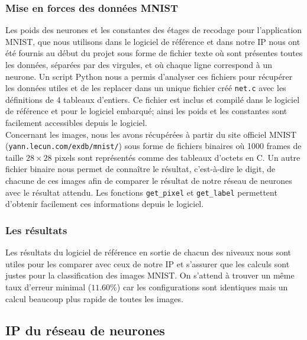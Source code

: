 \subsubsection{Mise en forces des données MNIST}

Les poids des neurones et les constantes des étages de recodage
pour l'application MNIST, que nous utilisons dans
le logiciel de référence et dans notre IP nous ont été fournis au début du projet
sous forme de fichier texte où sont présentes toutes les données, séparées par
des virgules, et où chaque ligne correspond à un neurone. Un script Python nous
a permis d'analyser ces fichiers pour récupérer les données utiles et de les
replacer dans un unique fichier créé \texttt{net.c} avec les définitions de
4 tableaux d'entiers. Ce fichier est inclus et compilé dans le logiciel de référence et
pour le logiciel embarqué; ainsi les poids et les constantes sont
facilement accessibles depuis le logiciel. \\
Concernant les images, nous les avons récupérées à partir du site
officiel MNIST \linebreak (\texttt{yann.lecun.com/exdb/mnist/}) sous forme de fichiers
binaires où 1000 frames de taille $28 \times 28$ pixels sont représentés comme
des tableaux d'octets en C. Un autre fichier binaire nous permet de connaître
le résultat, c'est-à-dire le digit, de chacune de ces images afin de comparer le
résultat de notre réseau de neurones avec le résultat attendu.
Les fonctions \texttt{get\_pixel} et \texttt{get\_label} permettent d'obtenir
facilement ces informations depuis le logiciel.

\subsubsection{Les résultats}

Les résultats du logiciel de référence en sortie de chacun des niveaux nous
sont utiles pour les comparer avec ceux de notre IP et s'assurer que les calculs
sont justes pour la classification des images MNIST. On s'attend à trouver
un même taux d'erreur minimal ($11.60\%$) car les configurations sont identiques
mais un calcul beaucoup plus rapide de toutes les images.

\subsection{IP du réseau de neurones}
